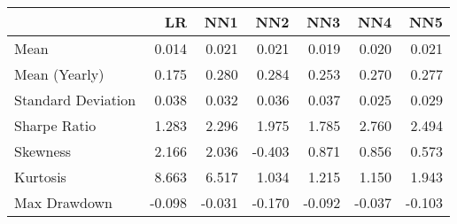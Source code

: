 \begin{tabular}{lrrrrrr}
\toprule
{} &     LR &    NN1 &    NN2 &    NN3 &    NN4 &    NN5 \\
\midrule
Mean               &  0.014 &  0.021 &  0.021 &  0.019 &  0.020 &  0.021 \\
Mean (Yearly)      &  0.175 &  0.280 &  0.284 &  0.253 &  0.270 &  0.277 \\
Standard Deviation &  0.038 &  0.032 &  0.036 &  0.037 &  0.025 &  0.029 \\
Sharpe Ratio       &  1.283 &  2.296 &  1.975 &  1.785 &  2.760 &  2.494 \\
Skewness           &  2.166 &  2.036 & -0.403 &  0.871 &  0.856 &  0.573 \\
Kurtosis           &  8.663 &  6.517 &  1.034 &  1.215 &  1.150 &  1.943 \\
Max Drawdown       & -0.098 & -0.031 & -0.170 & -0.092 & -0.037 & -0.103 \\
\bottomrule
\end{tabular}
